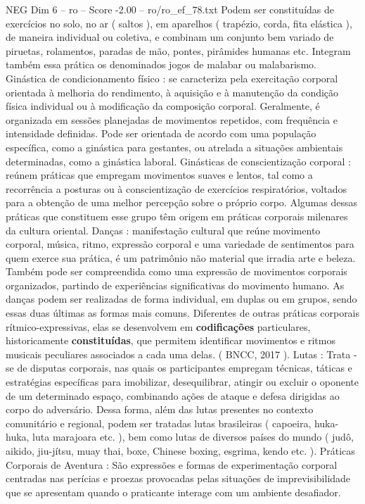 \begin{textsample}{NEG Dim 6 – ro – Score -2.00 – ro/ro\_ef\_78.txt}
Podem ser constituídas de exercícios no solo, no ar ( saltos ), em aparelhos ( trapézio, corda, fita elástica ), de maneira individual ou coletiva, e combinam um conjunto bem variado de piruetas, rolamentos, paradas de mão, pontes, pirâmides humanas etc.
Integram também essa prática os denominados jogos de malabar ou malabarismo.
Ginástica de condicionamento físico : se caracteriza pela exercitação corporal orientada à melhoria do rendimento, à aquisição e à manutenção da condição física individual ou à modificação da composição corporal.
Geralmente, é organizada em sessões planejadas de movimentos repetidos, com frequência e intensidade definidas.
Pode ser orientada de acordo com uma população específica, como a ginástica para gestantes, ou atrelada a situações ambientais determinadas, como a ginástica laboral.
Ginásticas de conscientização corporal : reúnem práticas que empregam movimentos suaves e lentos, tal como a recorrência a posturas ou à conscientização de exercícios respiratórios, voltados para a obtenção de uma melhor percepção sobre o próprio corpo.
Algumas dessas práticas que constituem esse grupo têm origem em práticas corporais milenares da cultura oriental.
Danças : manifestação cultural que reúne movimento corporal, música, ritmo, expressão corporal e uma variedade de sentimentos para quem exerce sua prática, é um patrimônio não material que irradia arte e beleza.
Também pode ser compreendida como uma expressão de movimentos corporais organizados, partindo de experiências significativas do movimento humano.
As danças podem ser realizadas de forma individual, em duplas ou em grupos, sendo essas duas últimas as formas mais comuns.
Diferentes de outras práticas corporais rítmico-expressivas, elas se desenvolvem em \textbf{codificações} particulares, historicamente \textbf{constituídas}, que permitem identificar movimentos e ritmos musicais peculiares associados a cada uma delas. ( BNCC, 2017 ).
Lutas : Trata -se de disputas corporais, nas quais os participantes empregam técnicas, táticas e estratégias específicas para imobilizar, desequilibrar, atingir ou excluir o oponente de um determinado espaço, combinando ações de ataque e defesa dirigidas ao corpo do adversário.
Dessa forma, além das lutas presentes no contexto comunitário e regional, podem ser tratadas lutas brasileiras ( capoeira, huka-huka, luta marajoara etc. ), bem como lutas de diversos países do mundo ( judô, aikido, jiu-jítsu, muay thai, boxe, Chinese boxing, esgrima, kendo etc. ).
Práticas Corporais de Aventura : São expressões e formas de experimentação corporal centradas nas perícias e proezas provocadas pelas situações de imprevisibilidade que se apresentam quando o praticante interage com um ambiente desafiador.

\end{textsample}
